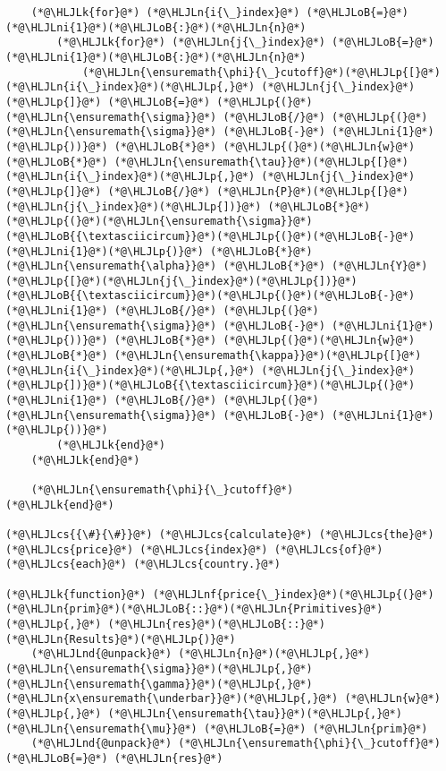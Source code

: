 \documentclass[12pt,a4paper]{article}
\newcommand{\HLJLk}[1]{\textcolor[RGB]{148,91,176}{\textbf{#1}}}
\newcommand{\HLJLn}[1]{#1}
\newcommand{\HLJLnd}[1]{\textcolor[RGB]{214,102,97}{#1}}
\newcommand{\HLJLnf}[1]{\textcolor[RGB]{66,102,213}{#1}}
\newcommand{\HLJLni}[1]{\textcolor[RGB]{59,151,46}{#1}}
\newcommand{\HLJLoB}[1]{\textcolor[RGB]{102,102,102}{\textbf{#1}}}
\newcommand{\HLJLp}[1]{#1}
\newcommand{\HLJLcs}[1]{\textcolor[RGB]{153,153,119}{\textit{#1}}}
\begin{document}
\begin{lstlisting}
    (*@\HLJLk{for}@*) (*@\HLJLn{i{\_}index}@*) (*@\HLJLoB{=}@*) (*@\HLJLni{1}@*)(*@\HLJLoB{:}@*)(*@\HLJLn{n}@*)
        (*@\HLJLk{for}@*) (*@\HLJLn{j{\_}index}@*) (*@\HLJLoB{=}@*) (*@\HLJLni{1}@*)(*@\HLJLoB{:}@*)(*@\HLJLn{n}@*)
            (*@\HLJLn{\ensuremath{\phi}{\_}cutoff}@*)(*@\HLJLp{[}@*)(*@\HLJLn{i{\_}index}@*)(*@\HLJLp{,}@*) (*@\HLJLn{j{\_}index}@*)(*@\HLJLp{]}@*) (*@\HLJLoB{=}@*) (*@\HLJLp{(}@*)(*@\HLJLn{\ensuremath{\sigma}}@*) (*@\HLJLoB{/}@*) (*@\HLJLp{(}@*)(*@\HLJLn{\ensuremath{\sigma}}@*) (*@\HLJLoB{-}@*) (*@\HLJLni{1}@*)(*@\HLJLp{))}@*) (*@\HLJLoB{*}@*) (*@\HLJLp{(}@*)(*@\HLJLn{w}@*) (*@\HLJLoB{*}@*) (*@\HLJLn{\ensuremath{\tau}}@*)(*@\HLJLp{[}@*)(*@\HLJLn{i{\_}index}@*)(*@\HLJLp{,}@*) (*@\HLJLn{j{\_}index}@*)(*@\HLJLp{]}@*) (*@\HLJLoB{/}@*) (*@\HLJLn{P}@*)(*@\HLJLp{[}@*)(*@\HLJLn{j{\_}index}@*)(*@\HLJLp{])}@*) (*@\HLJLoB{*}@*) (*@\HLJLp{(}@*)(*@\HLJLn{\ensuremath{\sigma}}@*)(*@\HLJLoB{{\textasciicircum}}@*)(*@\HLJLp{(}@*)(*@\HLJLoB{-}@*)(*@\HLJLni{1}@*)(*@\HLJLp{)}@*) (*@\HLJLoB{*}@*) (*@\HLJLn{\ensuremath{\alpha}}@*) (*@\HLJLoB{*}@*) (*@\HLJLn{Y}@*)(*@\HLJLp{[}@*)(*@\HLJLn{j{\_}index}@*)(*@\HLJLp{])}@*)(*@\HLJLoB{{\textasciicircum}}@*)(*@\HLJLp{(}@*)(*@\HLJLoB{-}@*)(*@\HLJLni{1}@*) (*@\HLJLoB{/}@*) (*@\HLJLp{(}@*)(*@\HLJLn{\ensuremath{\sigma}}@*) (*@\HLJLoB{-}@*) (*@\HLJLni{1}@*)(*@\HLJLp{))}@*) (*@\HLJLoB{*}@*) (*@\HLJLp{(}@*)(*@\HLJLn{w}@*) (*@\HLJLoB{*}@*) (*@\HLJLn{\ensuremath{\kappa}}@*)(*@\HLJLp{[}@*)(*@\HLJLn{i{\_}index}@*)(*@\HLJLp{,}@*) (*@\HLJLn{j{\_}index}@*)(*@\HLJLp{])}@*)(*@\HLJLoB{{\textasciicircum}}@*)(*@\HLJLp{(}@*)(*@\HLJLni{1}@*) (*@\HLJLoB{/}@*) (*@\HLJLp{(}@*)(*@\HLJLn{\ensuremath{\sigma}}@*) (*@\HLJLoB{-}@*) (*@\HLJLni{1}@*)(*@\HLJLp{))}@*)
        (*@\HLJLk{end}@*)
    (*@\HLJLk{end}@*)

    (*@\HLJLn{\ensuremath{\phi}{\_}cutoff}@*)
(*@\HLJLk{end}@*)

(*@\HLJLcs{{\#}{\#}}@*) (*@\HLJLcs{calculate}@*) (*@\HLJLcs{the}@*) (*@\HLJLcs{price}@*) (*@\HLJLcs{index}@*) (*@\HLJLcs{of}@*) (*@\HLJLcs{each}@*) (*@\HLJLcs{country.}@*)

(*@\HLJLk{function}@*) (*@\HLJLnf{price{\_}index}@*)(*@\HLJLp{(}@*)(*@\HLJLn{prim}@*)(*@\HLJLoB{::}@*)(*@\HLJLn{Primitives}@*)(*@\HLJLp{,}@*) (*@\HLJLn{res}@*)(*@\HLJLoB{::}@*)(*@\HLJLn{Results}@*)(*@\HLJLp{)}@*)
    (*@\HLJLnd{@unpack}@*) (*@\HLJLn{n}@*)(*@\HLJLp{,}@*) (*@\HLJLn{\ensuremath{\sigma}}@*)(*@\HLJLp{,}@*) (*@\HLJLn{\ensuremath{\gamma}}@*)(*@\HLJLp{,}@*) (*@\HLJLn{x\ensuremath{\underbar}}@*)(*@\HLJLp{,}@*) (*@\HLJLn{w}@*)(*@\HLJLp{,}@*) (*@\HLJLn{\ensuremath{\tau}}@*)(*@\HLJLp{,}@*) (*@\HLJLn{\ensuremath{\mu}}@*) (*@\HLJLoB{=}@*) (*@\HLJLn{prim}@*)
    (*@\HLJLnd{@unpack}@*) (*@\HLJLn{\ensuremath{\phi}{\_}cutoff}@*) (*@\HLJLoB{=}@*) (*@\HLJLn{res}@*)


\end{lstlisting}
\end{document}
